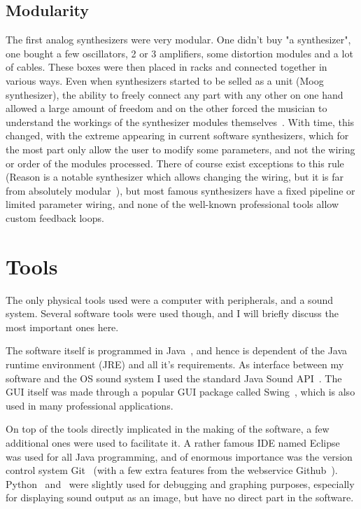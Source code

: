 \documentclass[11pt,a4paper]{article}
\begin{document}
\subsection{Modularity}

The first analog synthesizers were very modular. One didn't buy "a synthesizer", one bought a few oscillators, 2 or 3 amplifiers, some distortion modules and a lot of cables. These boxes were then placed in racks and connected together in various ways. Even when synthesizers started to be selled as a unit (Moog synthesizer), the ability to freely connect any part with any other on one hand allowed a large amount of freedom and on the other forced the musician to understand the workings of the synthesizer modules themselves~\cite{ModularMoog}. With time, this changed, with the extreme appearing in current software synthesizers, which for the most part only allow the user to modify some parameters, and not the wiring or order of the modules processed. There of course exist exceptions to this rule (Reason is a notable synthesizer which allows changing the wiring, but it is far from absolutely modular~\cite{Reason}), but most famous synthesizers have a fixed pipeline or limited parameter wiring, and none of the well-known professional tools allow custom feedback loops.

\section{Tools}

The only physical tools used were a computer with peripherals, and a sound system. Several software tools were used though, and I will briefly discuss the most important ones here.

The software itself is programmed in Java~\cite{Java}, and hence is dependent of the Java runtime environment (JRE) and all it's requirements. As interface between my software and the OS sound system I used the standard Java Sound API~\cite{Javasound}. The GUI itself was made through a popular GUI package called Swing~\cite{Swing}, which is also used in many professional applications.

On top of the tools directly implicated in the making of the software, a few additional ones were used to fac‎ilitate it. A rather famous IDE named Eclipse~\cite{Eclipse} was used for all Java programming, and of enormous importance was the version control system Git~\cite{Git} (with a few extra features from the webservice Github~\cite{Github}). Python~\cite{Python} and~\cite{Veusz} were slightly used for debugging and graphing purposes, especially for displaying sound output as an image, but have no direct part in the software.
\end{document}
